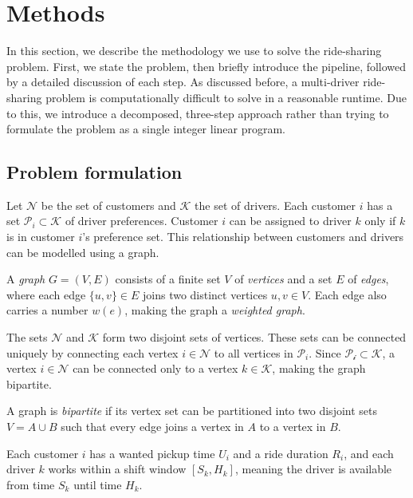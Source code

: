 \section{Methods}
\label{sec:methods}

In this section, we describe the methodology we use to solve the ride-sharing problem. First, we state the problem, then briefly introduce the pipeline, followed by a detailed discussion of each step. As discussed before, a multi-driver ride-sharing problem is computationally difficult to solve in a reasonable runtime. Due to this, we introduce a decomposed, three-step approach rather than trying to formulate the problem as a single integer linear program.

\subsection{Problem formulation}

Let $\mathcal{N}$ be the set of customers and $\mathcal{K}$ the set of drivers. Each customer $i$ has a set $\mathcal{P}_i\subset\mathcal{K}$ of driver preferences. Customer $i$ can be assigned to driver $k$ only if $ k$ is in customer $ i$'s preference set. This relationship between customers and drivers can be modelled using a graph.

\begin{definition}[Graph]
A \emph{graph} $G = (V, E)$ consists of a finite set $V$ of \emph{vertices} and a set $E$ of \emph{edges}, where each edge $\{u, v\} \in E$ joins two distinct vertices $u, v \in V$. Each edge also carries a number $w(e)$, making the graph a \emph{weighted graph}.
\end{definition}

The sets $\mathcal{N}$ and $\mathcal{K}$ form two disjoint sets of vertices. These sets can be connected uniquely by connecting each vertex $i\in\mathcal{N}$ to all vertices in $\mathcal{P}_i$. Since $\mathcal{P_i}\subset\mathcal{K}$, a vertex $i\in\mathcal{N}$ can be connected only to a vertex $k\in\mathcal{K}$, making the graph bipartite. 

\begin{definition}
A graph is \emph{bipartite} if its vertex set can be partitioned into two disjoint sets $V = A \cup B$ such that every edge joins a vertex in $A$ to a vertex in $B$.
\end{definition}

Each customer $i$ has a wanted pickup time $U_i$ and a ride duration $R_i$, and each driver $k$ works within a shift window $[S_k, H_k]$, meaning the driver is available from time $S_k$ until time $H_k$. 

